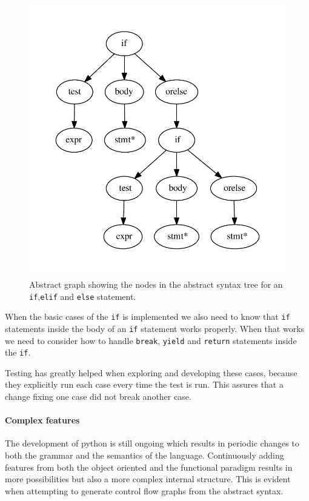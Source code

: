 \begin{figure}
  \centering
  \includegraphics[scale=.7]{./figures/dot_files/if_elif_else.pdf}
  \caption{Abstract graph showing the nodes in the abstract syntax tree for an \texttt{if},\texttt{elif} and \texttt{else} statement.}
  \label{test:ast:if_elif_else}
\end{figure}

When the basic cases of the \texttt{if} is implemented we also need to know that \texttt{if} statements inside the body of an \texttt{if} statement works properly.
When that works we need to consider how to handle \texttt{break}, \texttt{yield} and \texttt{return} statements inside the \texttt{if}.

Testing has greatly helped when exploring and developing these cases, because they explicitly run each case every time the test is run.
This assures that a change fixing one case did not break another case.

\paragraph{Complex features}
The development of python is still ongoing which results in periodic changes to both the grammar and the semantics of the language.
Continuously adding features from both the object oriented and the functional paradigm results in more possibilities but also a more complex internal structure.
This is evident when attempting to generate control flow graphs from the abstract syntax.

